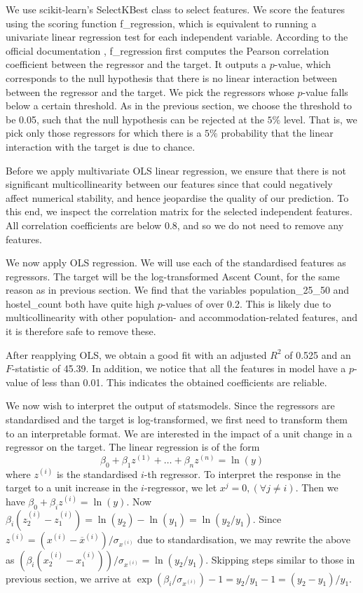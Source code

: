 \documentclass[11pt,a4paper]{article}
\begin{document}
We use scikit-learn's SelectKBest class to select features. We score the features using the scoring function f\_regression, which is equivalent to running a univariate linear regression test for each independent variable. According to the official documentation \cite{scikit-learn}, f\_regression first computes the Pearson correlation coefficient between the regressor and the target. It outputs a $p$-value, which corresponds to the null hypothesis that there is no linear interaction between between the regressor and the target. We pick the regressors whose $p$-value falls below a certain threshold. As in the previous section, we choose the threshold to be 0.05, such that the null hypothesis can be rejected at the $5\%$ level. That is, we pick only those regressors for which there is a $5\%$ probability that the linear interaction with the target is due to chance.

Before we apply multivariate OLS linear regression, we ensure that there is not significant multicollinearity between our features since that could negatively affect numerical stability, and hence jeopardise the quality of our prediction. To this end, we inspect the correlation matrix for the selected independent features. All correlation coefficients are below 0.8, and so we do not need to remove any features.

We now apply OLS regression. We will use each of the standardised features as regressors. The target will be the log-transformed Ascent Count, for the same reason as in previous section. We find that the variables population\_25\_50 and hostel\_count both have quite high $p$-values of over 0.2. This is likely due to multicollinearity with other population- and accommodation-related features, and it is therefore safe to remove these.

After reapplying OLS, we obtain a good fit with an adjusted $R^{2}$ of 0.525 and an $F$-statistic of 45.39. In addition, we notice that all the features in model have a $p$-value of less than 0.01. This indicates the obtained coefficients are reliable.

We now wish to interpret the output of statsmodels. Since the regressors are standardised and the target is log-transformed, we first need to transform them to an interpretable format. We are interested in the impact of a unit change in a regressor on the target. The linear regression is of the form 
$$\beta_0+\beta_1z^{(1)}+ \dots + \beta_n z^{(n)}=\ln(y)$$ 
where $z^{(i)}$ is the standardised $i$-th regressor. To interpret the response in the target to a unit increase in the $i$-regressor, we let $x^j = 0, (\forall j \neq i)$. Then we have $\beta_0 + \beta_i z^{(i)} = \ln(y)$. Now $\beta_i (z_2^{(i)} - z_1^{(i)}) = \ln(y_2) - \ln(y_1)=\ln(y_2/y_1)$. Since 
$z^{(i)} = (x^{(i)} - \overline{x}^{(i)})/\sigma_{x^{(i)}}$
due to standardisation, we may rewrite the above as $(\beta_i (x_2^{(i)} - x_1^{(i)}))/\sigma_{x^{(i)}} =\ln(y_2/y_1)$. Skipping steps similar to those in previous section, we arrive at $\exp(\beta_i / \sigma_{x^{(i)}}) - 1 = y_2 / y_1 - 1 = (y_2 - y_1) / y_1$.
\end{document}
